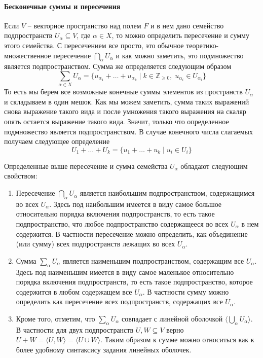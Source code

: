 \paragraph{Бесконечные суммы и пересечения}

Если $V$ -- векторное пространство над полем $F$ и в нем дано семейство подпространств $U_\alpha \subseteq V$, где $\alpha\in X$, то можно определить пересечение и сумму этого семейства.
С пересечением все просто, это обычное теоретико-множественное пересечение $\bigcap_{\alpha} U_\alpha$ и как можно заметить, это подмножество является подпространством.
Сумма же определяется следующим образом
\[
\sum_{\alpha \in X} U_\alpha = \{u_{\alpha_1}+\ldots+u_{\alpha_k} \mid k\in\mathbb Z_{\geqslant 0},\; u_{\alpha_i}\in U_{\alpha_i}\}
\]
То есть мы берем все возможные конечные суммы элементов из пространств $U_\alpha$ и складываем в один мешок.
Как мы можем заметить, сумма таких выражений снова выражение такого вида и после умножения такого выражения на скаляр опять остается выражение такого вида.
Значит, только что определенное подмножество является подпространством.
В случае конечного числа слагаемых получаем следующее определение
\[
U_1 + \ldots + U_k = \{u_1 + \ldots + u_k \mid u_i\in U_i\}
\]

Определенные выше пересечение и сумма семейства $U_\alpha$ обладают следующим свойством:
\begin{enumerate}
\item Пересечение $\bigcap_{\alpha} U_\alpha$ является наибольшим подпространством, содержащимся во всех $U_\alpha$.
Здесь под наибольшим имеется в виду самое большое относительно порядка включения подпространств, то есть такое подпространство, что любое подпространство содержащееся во всех $U_\alpha$ в нем содержится.
В частности пересечение можно определить, как объединение (или сумму) всех подпространств лежащих во всех $U_\alpha$.

\item Сумма $\sum_\alpha U_\alpha$ является наименьшим подпространством, содержащим все $U_\alpha$.
Здесь под наименьшим имеется в виду самое маленькое относительно порядка включения подпространств, то есть такое подпространство, которое содержится в любом содержащем все $U_\alpha$.
В частности сумму можно определить как пересечение всех подпространств, содержащих все $U_\alpha$.

\item Кроме того, отметим, что $\sum_{\alpha} U_\alpha$ совпадает с линейной оболочкой $\langle \bigcup_\alpha U_\alpha \rangle$.
В частности для двух подпространств $U,W\subseteq V$ верно $U + W = \langle U, W\rangle = \langle U\cup W\rangle$.
Таким образом к сумме можно относиться как к более удобному синтаксису задания линейных оболочек.
\end{enumerate}




